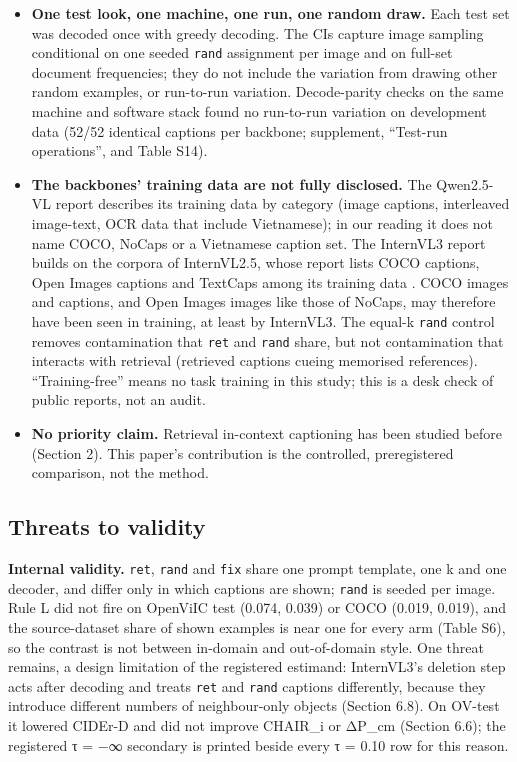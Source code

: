 \documentclass[manuscript,screen]{acmart}
\begin{document}
\begin{itemize}
  rule's thresholds would not be caught. The same rule protected the English sets.
\item
  \textbf{One test look, one machine, one run, one random draw.} Each test set was decoded once with
  greedy decoding. The CIs capture image sampling conditional on one seeded \texttt{rand} assignment
  per image and on full-set document frequencies; they do not include the variation from drawing
  other random examples, or run-to-run variation. Decode-parity checks on the same machine and
  software stack found no run-to-run variation on development data (52/52 identical captions per
  backbone; supplement, ``Test-run operations'', and Table S14).
\item
  \textbf{The backbones' training data are not fully disclosed.} The Qwen2.5-VL report
  \citep{Bai2025Qwen25VL} describes its training data by category (image captions, interleaved
  image-text, OCR data that include Vietnamese); in our reading it does not name COCO, NoCaps or a
  Vietnamese caption set. The InternVL3 report \citep{Zhu2025InternVL3} builds on the corpora of
  InternVL2.5, whose report lists COCO captions, Open Images captions and TextCaps among its
  training data \citep{Chen2024InternVL25}. COCO images and captions, and Open Images images like
  those of NoCaps, may therefore have been seen in training, at least by InternVL3. The equal-k
  \texttt{rand} control removes contamination that \texttt{ret} and \texttt{rand} share, but not
  contamination that interacts with retrieval (retrieved captions cueing memorised references).
  ``Training-free'' means no task training in this study; this is a desk check of public reports,
  not an audit.
\item
  \textbf{No priority claim.} Retrieval in-context captioning has been studied before (Section 2).
  This paper's contribution is the controlled, preregistered comparison, not the method.
\end{itemize}

\subsection{Threats to validity}\label{threats-to-validity}

\textbf{Internal validity.} \texttt{ret}, \texttt{rand} and \texttt{fix} share one prompt template,
one k and one decoder, and differ only in which captions are shown; \texttt{rand} is seeded per
image. Rule L did not fire on OpenViIC test (0.074, 0.039) or COCO (0.019, 0.019), and the
source-dataset share of shown examples is near one for every arm (Table S6), so the contrast is not
between in-domain and out-of-domain style. One threat remains, a design limitation of the registered
estimand: InternVL3's deletion step acts after decoding and treats \texttt{ret} and \texttt{rand}
captions differently, because they introduce different numbers of neighbour-only objects (Section
6.8). On OV-test it lowered CIDEr-D and did not improve CHAIR\_i or ΔP\_cm (Section 6.6); the
registered τ = −∞ secondary is printed beside every τ = 0.10 row for this reason.
\end{document}
